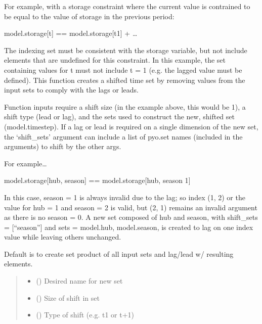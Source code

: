 \documentclass[letterpaper,10pt,english]{sphinxmanual}
\begin{document}
\begin{fulllineitems}
\begin{fulllineitems}
\sphinxAtStartPar
For example, with a storage constraint where the current value is contrained to be equal to
the value of storage in the previous period:

\sphinxAtStartPar
model.storage{[}t{]} == model.storage{[}t\sphinxhyphen{}1{]} + …

\sphinxAtStartPar
The indexing set must be consistent with the storage variable, but not include elements that
are undefined for this constraint. In this example, the set containing values for t must not
include t = 1 (e.g. the lagged value must be defined). This function creates a shifted time
set by removing values from the input sets to comply with the lags or leads.

\sphinxAtStartPar
Function inputs require a shift size (in the example above, this would be 1), a shift type
(lead or lag), and the sets used to construct the new, shifted set (model.timestep). If a
lag or lead is required on a single dimension of the new set, the ‘shift\_sets’ argument can
include a list of pyo.set names (included in the arguments) to shift by the other args.

\sphinxAtStartPar
For example…

\sphinxAtStartPar
model.storage{[}hub, season{]} == model.storage{[}hub, season \sphinxhyphen{} 1{]}

\sphinxAtStartPar
In this case, season = 1 is always invalid due to the lag; so index (1, 2) or the value for
hub = 1 and season = 2 is valid, but (2, 1) remains an invalid argument as there is no
season = 0. A new set composed of hub and season, with shift\_sets = {[}“season”{]} and
sets = model.hub, model.season, is created to lag on one index value while leaving others
unchanged.

\sphinxAtStartPar
Default is to create set product of all input sets and lag/lead w/ resulting elements.
\begin{quote}\begin{description}
\begin{itemize}
\item {} 
\sphinxAtStartPar
{} () \textendash{} Desired name for new set

\item {} 
\sphinxAtStartPar
{} () \textendash{} Size of shift in set

\item {} 
\sphinxAtStartPar
{} (\sphinxstyleliteralemphasis{\sphinxupquote{ {[}}}\sphinxstyleliteralemphasis{\sphinxupquote{, }}\sphinxstyleliteralemphasis{\sphinxupquote{{]}}}) \textendash{} Type of shift (e.g. t\sphinxhyphen{}1 or t+1)


\end{itemize}
\end{description}
\end{quote}
\end{fulllineitems}
\end{fulllineitems}
\end{document}
